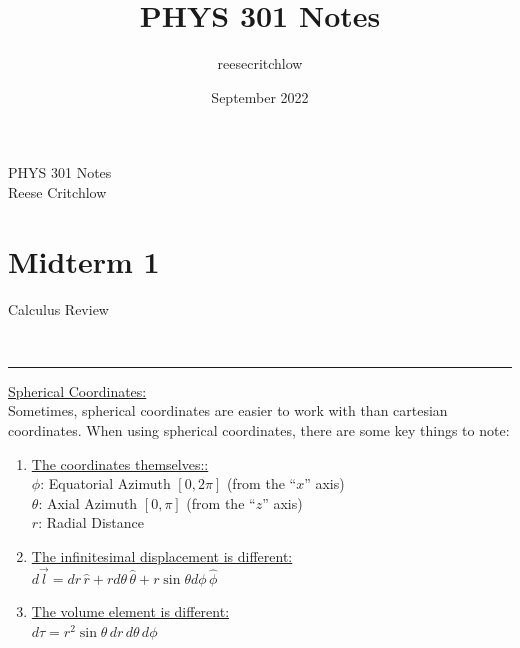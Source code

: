 \documentclass{article}
\title{PHYS 301 Notes}
\author{reesecritchlow }
\date{September 2022}
\newcommand{\header}[1]{\begin{large}\noindent #1\end{large}\\\rule{\textwidth}{0.5pt}}
\newcommand{\sheader}[1]{\underline{#1:}}
\newcommand{\smallgap}{\smallskip\\}
\begin{document}
\begin{center}
    \Large PHYS 301 Notes\\
    \normalsize Reese Critchlow
\end{center}

\section*{Midterm 1}

\header{Calculus Review}

\sheader{Spherical Coordinates}
\smallskip\\
Sometimes, spherical coordinates are easier to work with than cartesian coordinates.
When using spherical coordinates, there are some key things to note:
\begin{enumerate}
    \item \sheader{The coordinates themselves:} 
    \smallgap
    $\phi$: Equatorial Azimuth $[0, 2\pi]$ (from the ``$x$'' axis)\\
    $\theta$: Axial Azimuth $[0, \pi]$ (from the ``$z$'' axis)\\
    $r$: Radial Distance
    \item \underline{The infinitesimal displacement is different:}
    \smallgap
    $d\vec{l} = dr \, \hat{r} + r d\theta \, \hat{\theta} + r \sin \theta d\phi \, \hat{\phi}$
    \item \underline{The volume element is different:}
    \smallgap
    $d\tau = r^2 \sin \theta \, dr \, d\theta \, d\phi$
\end{enumerate}
\end{document}
